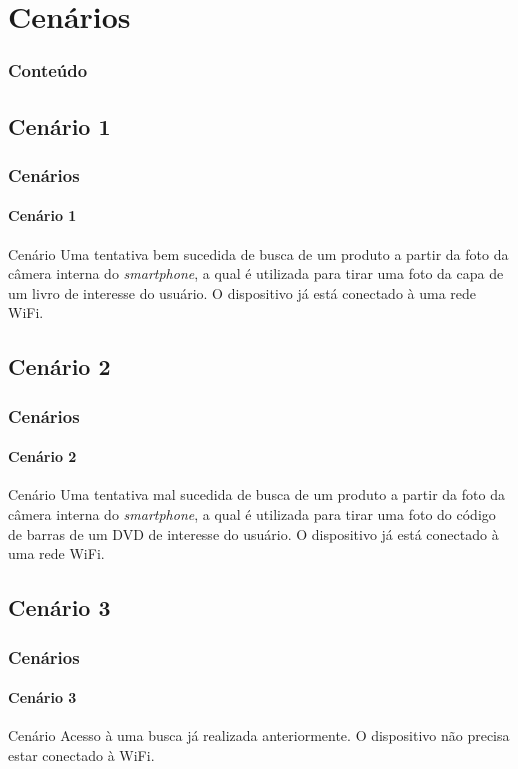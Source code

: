\documentclass[14pt,beamer]{beamer}
\begin{document}
\section{Cenários}

\begin{frame}
	\frametitle{Conteúdo}
    \begin{multicols}{2}
        \small
    \end{multicols}
\end{frame}

\subsection{Cenário 1}
\begin{frame}
	\frametitle{Cenários}
	\framesubtitle{Cenário 1}

    \begin{block}{Cenário}
    Uma tentativa bem sucedida de busca de um produto a partir da foto da câmera
    interna do \emph{smartphone}, a qual é utilizada para tirar uma foto da capa de um livro de
    interesse do usuário. O dispositivo já está conectado à uma rede WiFi.
    \end{block}
\end{frame}

\subsection{Cenário 2}
\begin{frame}
	\frametitle{Cenários}
	\framesubtitle{Cenário 2}

    \begin{block}{Cenário}
    Uma tentativa mal sucedida de busca de um produto a partir da
    foto da câmera interna do \emph{smartphone}, a qual é utilizada para
    tirar uma foto do código de barras de um DVD de interesse do usuário.  O dispositivo
    já está conectado à uma rede WiFi.
    \end{block}
\end{frame}

\subsection{Cenário 3}
\begin{frame}
	\frametitle{Cenários}
	\framesubtitle{Cenário 3}

    \begin{block}{Cenário}
    Acesso à uma busca já realizada anteriormente.  O dispositivo
    não precisa estar conectado à WiFi.
    \end{block}
\end{frame}
\end{document}
